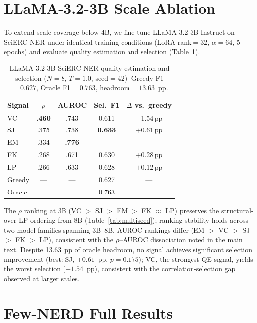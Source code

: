 \section{LLaMA-3.2-3B Scale Ablation}\label{app:llama3b}

To extend scale coverage below 4B, we fine-tune LLaMA-3.2-3B-Instruct on SciERC NER under identical training conditions (LoRA rank${=}32$, $\alpha{=}64$, 5 epochs) and evaluate quality estimation and selection (Table~\ref{tab:llama3b}).

\begin{table}[t]
\centering
\small
\caption{LLaMA-3.2-3B SciERC NER quality estimation and selection ($N{=}8$, $T{=}1.0$, seed${=}42$). Greedy F1${=}0.627$, Oracle F1${=}0.763$, headroom${=}13.63$~pp.}
\label{tab:llama3b}
\begin{tabular}{l cc cc}
\toprule
Signal & $\rho$ & AUROC & Sel.\ F1 & $\Delta$ vs.\ greedy \\
\midrule
VC & \textbf{.460} & .743 & 0.611 & $-$1.54\,pp \\
SJ & .375 & .738 & \textbf{0.633} & $+$0.61\,pp \\
EM & .334 & \textbf{.776} & --- & --- \\
FK & .268 & .671 & 0.630 & $+$0.28\,pp \\
LP & .266 & .633 & 0.628 & $+$0.12\,pp \\
\midrule
Greedy & --- & --- & 0.627 & --- \\
Oracle & --- & --- & 0.763 & --- \\
\bottomrule
\end{tabular}
\end{table}

The $\rho$ ranking at 3B (VC $>$ SJ $>$ EM $>$ FK $\approx$ LP) preserves the structural-over-LP ordering from 8B (Table~\ref{tab:multiseed}); ranking stability holds across two model families spanning 3B--8B.
AUROC rankings differ (EM $>$ VC $>$ SJ $>$ FK $>$ LP), consistent with the $\rho$--AUROC dissociation noted in the main text.
Despite 13.63~pp of oracle headroom, no signal achieves significant selection improvement (best: SJ, $+0.61$~pp, $p{=}0.175$); VC, the strongest QE signal, yields the worst selection ($-1.54$~pp), consistent with the correlation-selection gap observed at larger scales.

\section{Few-NERD Full Results}\label{app:fewnerd}

